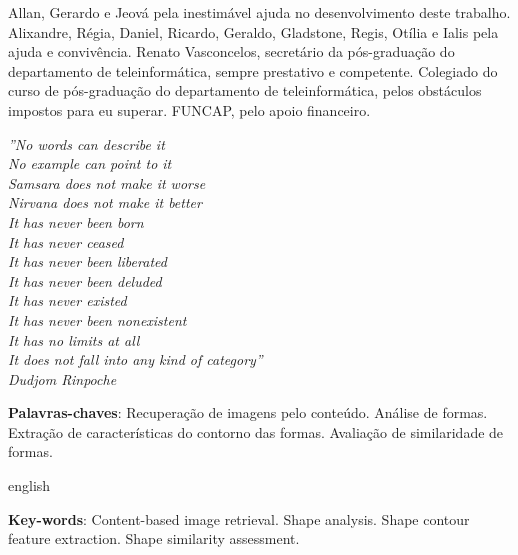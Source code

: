 \documentclass[
	12pt,				%
	openright,			%
	twoside,			%
	a4paper,			%
	english,			%
  	brazil				%
	]{abntex2}
\begin{document}
\begin{agradecimentos}
Allan, Gerardo e Jeová pela inestimável ajuda no desenvolvimento deste trabalho.
Alixandre, Régia, Daniel, Ricardo, Geraldo, Gladstone, Regis, Otília  e Ialis pela ajuda e convivência.
Renato Vasconcelos, secretário da pós-graduação do departamento de teleinformática, sempre prestativo e competente.
Colegiado do curso de pós-graduação do departamento de teleinformática, pelos obstáculos impostos para eu superar.
FUNCAP, pelo apoio financeiro.
\end{agradecimentos}

\begin{epigrafe}
    \vspace*{\fill}
	\begin{flushright}
		\textit{''No words can describe it\\
    No example can point to it\\
    Samsara does not make it worse\\
    Nirvana does not make it better\\
    It has never been born\\
    It has never ceased\\
    It has never been liberated\\
    It has never been deluded\\
    It has never existed\\
    It has never been nonexistent\\
    It has no limits at all\\
    It does not fall into any kind of category''\\
	Dudjom Rinpoche}
	\end{flushright}
\end{epigrafe}


\setlength{\absparsep}{18pt} %
\begin{resumo}

\vspace{\onelineskip}
\noindent 
 \textbf{Palavras-chaves}: Recuperação de imagens pelo conteúdo. Análise de formas. Extração de características do contorno das formas. Avaliação de similaridade de formas.
\end{resumo}

\begin{resumo}[Abstract]
\begin{otherlanguage*}{english}
 
\vspace{\onelineskip}
\noindent 
\textbf{Key-words}: Content-based image retrieval. Shape analysis. Shape contour feature extraction. Shape similarity assessment.
 \end{otherlanguage*}
\end{resumo}
\end{document}
